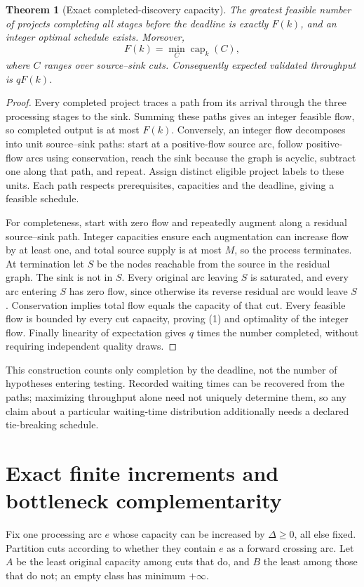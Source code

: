 \documentclass[11pt]{article}
\newtheorem{theorem}{Theorem}
\theoremstyle{definition}
\begin{document}
\begin{theorem}[Exact completed-discovery capacity]
The greatest feasible number of projects completing all stages before the deadline is exactly $F(k)$, and an integer optimal schedule exists. Moreover,
\[
 F(k)=\min_{C}\operatorname{cap}_k(C),
 \tag{1}
\]
where $C$ ranges over source--sink cuts. Consequently expected validated throughput is $qF(k)$.
\end{theorem}
\begin{proof}
Every completed project traces a path from its arrival through the three processing stages to the sink. Summing these paths gives an integer feasible flow, so completed output is at most $F(k)$. Conversely, an integer flow decomposes into unit source--sink paths: start at a positive-flow source arc, follow positive-flow arcs using conservation, reach the sink because the graph is acyclic, subtract one along that path, and repeat. Assign distinct eligible project labels to these units. Each path respects prerequisites, capacities and the deadline, giving a feasible schedule.

For completeness, start with zero flow and repeatedly augment along a residual source--sink path. Integer capacities ensure each augmentation can increase flow by at least one, and total source supply is at most $M$, so the process terminates. At termination let $S$ be the nodes reachable from the source in the residual graph. The sink is not in $S$. Every original arc leaving $S$ is saturated, and every arc entering $S$ has zero flow, since otherwise its reverse residual arc would leave $S$. Conservation implies total flow equals the capacity of that cut. Every feasible flow is bounded by every cut capacity, proving (1) and optimality of the integer flow. Finally linearity of expectation gives $q$ times the number completed, without requiring independent quality draws.
\end{proof}
This construction counts only completion by the deadline, not the number of hypotheses entering testing. Recorded waiting times can be recovered from the paths; maximizing throughput alone need not uniquely determine them, so any claim about a particular waiting-time distribution additionally needs a declared tie-breaking schedule.

\section*{Exact finite increments and bottleneck complementarity}
Fix one processing arc $e$ whose capacity can be increased by $\Delta\ge0$, all else fixed. Partition cuts according to whether they contain $e$ as a forward crossing arc. Let $A$ be the least original capacity among cuts that do, and $B$ the least among those that do not; an empty class has minimum $+\infty$.
\end{document}
